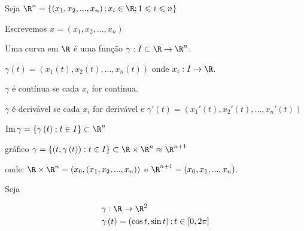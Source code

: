 \documentclass[11pt, oneside, a4paper]{gsm-l}
\begin{document}
Seja $\R^n = \left\{ {\left( {x_1 ,x_2 ,...,x_n } \right);x_i  \in \R;1 \leqslant i \leqslant n} \right\}$

Escrevemos $x = \left( {x_1 ,x_2 ,...,x_n } \right)$

\begin{defi}
    Uma curva em $\R$ é uma função $\gamma :I \subset \R \to \R^n$.

    $\gamma \left( t \right) = \left( {x_1 \left( t \right),x_2 \left( t \right),...,x_n \left( t \right)} \right)$ onde $x_i :I \to \R$.

$\gamma$ é contínua se cada $x_i$ for contínua.

    $\gamma$ é derivável se cada $x_i$ for derivável e $\gamma '\left( t \right) = \left( {x_1 '\left( t \right),x_2 '\left( t \right),...,x_n '\left( t \right)} \right)$

    $\operatorname{Im} \gamma  = \left\{ {\gamma \left( t \right):t \in I} \right\} \subset \R^n$

    gráfico $\gamma  = \left\{ {\left( {t,\gamma \left( t \right)} \right):t \in I} \right\} \subset \R \times \R^n  \approx \R^{n + 1}$

    onde: $\R \times \R^n  = \left( {x_0 ,\left( {x_1 ,x_2 ,...,x_n } \right)} \right)$ e $\R^{n + 1}  = \left( {x_0 ,x_1 ,...,x_n } \right)$.
\end{defi}

\begin{exem}
Seja

\[
\begin{gathered}
\gamma :\R \to \R^2  \hfill \\
  \gamma \left( t \right) = \left( {\cos t,\sin t} \right);t \in \left[ {0,2\pi } \right] \hfill \\
\end{gathered}
\]
\end{exem}
\end{document}
